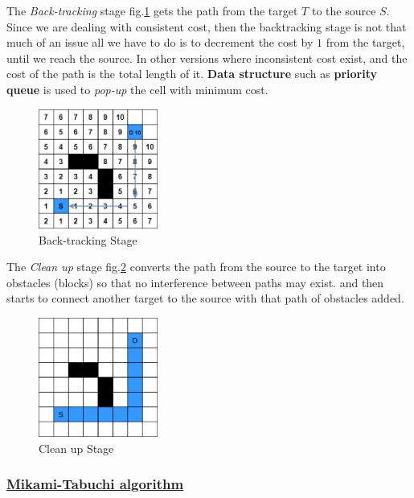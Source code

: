     The \textit{Back-tracking} stage fig.\ref{fig:backtrackingStage} gets the path from the target $T$
    to the source $S$.
    Since we are dealing with consistent cost, then the backtracking stage is not that much of an issue
    all we have to do is to decrement the cost by $1$ from the target, until we reach the source.
    In other versions where inconsistent cost exist, and the cost of the path is the total length of it.
    \textbf{Data structure} such as \textbf{priority queue} is used to \textit{pop-up}
    the cell with minimum cost.

    \begin{figure}[H]
        \centering
        \includegraphics[width=0.35\textwidth]{figures/Lee Stages/back-track.png}
        \caption{Back-tracking Stage}
        \label{fig:backtrackingStage}
    \end{figure}

    The \textit{Clean up} stage fig.\ref{fig:cleanUpStage} converts the path from the source
    to the target into obstacles (blocks) so that no interference between paths may exist.
    and then starts to connect another target to the source with that path of obstacles added.

    \begin{figure}[H]
        \centering
        \includegraphics[width=0.35\textwidth]{figures/Lee Stages/clean_up.png}
        \caption{Clean up Stage}
        \label{fig:cleanUpStage}
    \end{figure}

    \subsubsection{\underline{Mikami-Tabuchi algorithm}}
    \label{MikamiSection}
    

